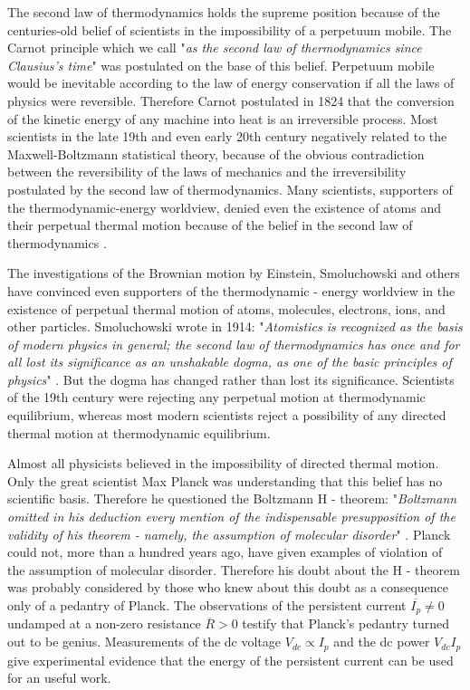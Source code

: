 \documentclass[twocolumn,secnumarabic,amssymb, nobibnotes, aps, prd]{revtex4}
\begin{document}
The second law of thermodynamics holds the supreme position because of the centuries-old belief of scientists in the impossibility of a perpetuum mobile. The Carnot principle which we call "{\it as the second law of thermodynamics since Clausius's time}" \cite{Smoluchowski} was postulated on the base of this belief. Perpetuum mobile would be inevitable according to the law of energy conservation if all the laws of physics were reversible. Therefore Carnot postulated in 1824 that the conversion of the kinetic energy of any machine into heat is an irreversible process. Most scientists in the late 19th and even early 20th century negatively related to the Maxwell-Boltzmann statistical theory, because of the obvious contradiction between the reversibility of the laws of mechanics and the irreversibility postulated by the second law of thermodynamics. Many scientists, supporters of the thermodynamic-energy worldview, denied even the existence of atoms and their perpetual thermal motion because of the belief in the second law of thermodynamics \cite{Smoluchowski}.  

The investigations of the Brownian motion by Einstein, Smoluchowski and others have convinced even supporters of the thermodynamic - energy worldview in the existence of perpetual thermal motion of atoms, molecules, electrons, ions, and other particles. Smoluchowski wrote in 1914: "{\it Atomistics is recognized as the basis of modern physics in general; the second law of thermodynamics has once and for all lost its significance as an unshakable dogma, as one of the basic principles of physics}" \cite{Smoluchowski}. But the dogma has changed rather than lost its significance. Scientists of the 19th century were rejecting any perpetual motion at thermodynamic equilibrium, whereas most modern scientists reject a possibility of any directed thermal motion at thermodynamic equilibrium. 

Almost all physicists believed in the impossibility of directed thermal motion. Only the great scientist Max Planck was understanding that this belief has no scientific basis. Therefore he questioned the Boltzmann H - theorem: "{\it Boltzmann omitted in his deduction every mention of the indispensable presupposition of the validity of his theorem - namely, the assumption of molecular disorder}" \cite{Planck}. Planck could not, more than a hundred years ago, have given examples of violation of the assumption of molecular disorder. Therefore his doubt about the H - theorem was probably considered by those who knew about this doubt as a consequence only of a pedantry of Planck. The observations \cite{Letter2007,LP1962,PC2007,Science2009PC,PRL2009PC} of the persistent current $\overline{I_{p}} \neq 0$ undamped at a non-zero resistance $\overline{R} > 0$ testify that Planck's pedantry turned out to be genius. Measurements \cite{Physica2019} of the dc voltage $V_{dc} \propto I_{p}$ and the dc power $V_{dc}I_{p}$ give experimental evidence that the energy of the persistent current can be used for an useful work.  
\end{document}
